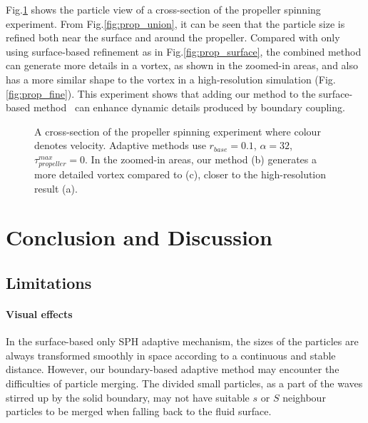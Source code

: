 \documentclass[VANCOUVER,STIX1COL]{WileyNJD-v2}
\begin{document}
Fig.\ref{fig:prop} shows the particle view of a cross-section of the propeller spinning experiment. From Fig.\ref{fig:prop_union}, it can be seen that the particle size is refined both near the surface and around the propeller. Compared with only using surface-based refinement as in Fig.\ref{fig:prop_surface}, the combined method can generate more details in a vortex, as shown in the zoomed-in areas, and also has a more similar shape to the vortex in a high-resolution simulation (Fig.\ref{fig:prop_fine}). This experiment shows that adding our method to the surface-based method~\cite{Winchenbach17} can enhance dynamic details produced by boundary coupling.

\begin{figure}[htbp]

\centering
{}
\vspace{-0.7\baselineskip}
\caption{
A cross-section of the propeller spinning experiment where colour denotes velocity. Adaptive methods use $r_{base} = 0.1$, $\alpha = 32$, $\tau^{max}_{propeller} = 0$. In the zoomed-in areas, our method (b) generates a more detailed vortex compared to (c), closer to the high-resolution result (a).
}
\label{fig:prop}

\end{figure}

\section{Conclusion and Discussion}

\subsection{Limitations}

\paragraph{Visual effects}
In the surface-based only SPH adaptive mechanism, the sizes of the particles are always transformed smoothly in space according to a continuous and stable distance. However, our boundary-based adaptive method may encounter the difficulties of particle merging. The divided small particles, as a part of the waves stirred up by the solid boundary, may not have suitable $s$ or $S$ neighbour particles to be merged when falling back to the fluid surface.
\end{document}
